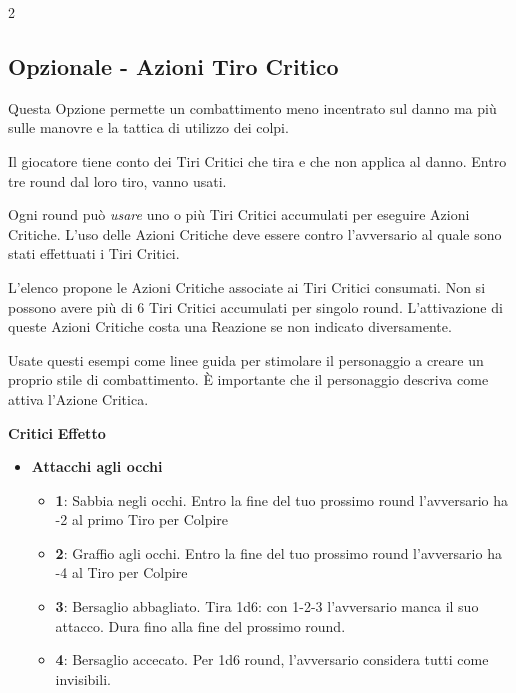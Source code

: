 \begin{multicols}{2}
\subsection{Opzionale - Azioni Tiro Critico}\label{OpzionaleAzioniTiroCritico}\hypertarget{OpzionaleAzioniTiroCritico}{}

Questa Opzione permette un combattimento meno incentrato sul danno ma più sulle manovre e la tattica di utilizzo dei colpi.

Il giocatore tiene conto dei Tiri Critici che tira e che non applica al danno. Entro tre round dal loro tiro, vanno usati.

Ogni round può \emph{usare} uno o più Tiri Critici accumulati per eseguire Azioni Critiche. L'uso delle Azioni Critiche deve essere contro l'avversario al quale sono stati effettuati i Tiri Critici.

L'elenco propone le Azioni Critiche associate ai Tiri Critici consumati. Non si possono avere più di 6 Tiri Critici accumulati per singolo round.
L'attivazione di queste Azioni Critiche costa una Reazione se non indicato diversamente.

Usate questi esempi come linee guida per stimolare il personaggio a creare un proprio stile di combattimento. È importante che il personaggio descriva come attiva l'Azione Critica.

\medskip

\noindent\textbf{Critici} \hskip 0.5cm \textbf{Effetto}

\medskip

\begin{itemize}[leftmargin=*]
	\setlength{\itemsep}{0pt}

	\item \textbf{Attacchi agli occhi}
	\begin{itemize}[leftmargin=*]
		\setlength{\itemsep}{0pt}
		\item \textbf{1}: Sabbia negli occhi. Entro la fine del tuo prossimo round l'avversario ha -2 al primo Tiro per Colpire

		\item \textbf{2}: Graffio agli occhi. Entro la fine del tuo prossimo round l'avversario ha -4 al Tiro per Colpire

\item \textbf{3}: Bersaglio abbagliato. Tira 1d6: con 1-2-3 l'avversario manca il suo attacco. Dura fino alla fine del prossimo round.

		\item \textbf{4}: Bersaglio accecato. Per 1d6 round, l'avversario considera tutti come invisibili.


\end{itemize}
\end{itemize}
\end{multicols}
